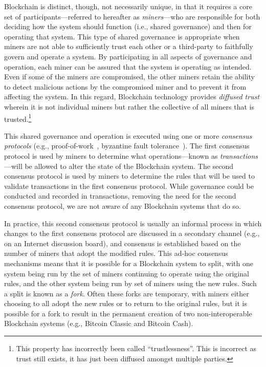 Blockchain is distinct, though, not necessarily unique, in that it requires a core set of participants---referred to hereafter as \emph{miners}---who are responsible for both deciding how the system should function (i.e., shared governance) and then for operating that system.
This type of shared governance is appropriate when miners are not able to sufficiently trust each other or a third-party to faithfully govern and operate a system.
By participating in all aspects of governance and operation, each miner can be assured that the system is operating as intended.
Even if some of the miners are compromised, the other miners retain the ability to detect malicious actions by the compromised miner and to prevent it from affecting the system.
In this regard, Blockchain technology provides \emph{diffused trust} wherein it is not individual miners but rather the collective of all miners that is trusted.\footnote{This property has incorrectly been called ``trustlessness''. This is incorrect as trust still exists, it has just been diffused amongst multiple parties.} 

This shared governance and operation is executed using one or more \emph{consensus protocols} (e.g., proof-of-work~\cite{DN93,back1997partial,NakamotoS8}, byzantine fault tolerance~\cite{castro1999practical}).
The first consensus protocol is used by miners to determine what operations---known as \emph{transactions}---will be allowed to alter the state of the Blockchain system.
The second consensus protocol is used by miners to determine the rules that will be used to validate transactions in the first consensus protocol.
While governance could be conducted and recorded in transactions, removing the need for the second consensus protocol, we are not aware of any Blockchain systems that do so.

In practice, this second consensus protocol is usually an informal process in which changes to the first consensus protocol are discussed in a secondary channel (e.g., on an Internet discussion board), and consensus is established based on the number of miners that adopt the modified rules.
This ad-hoc consensus mechanisms means that it is possible for a Blockchain system to split, with one system being run by the set of miners continuing to operate using the original rules, and the other system being run by set of miners using the new rules.
Such a split is known as a \emph{fork}.
Often these forks are temporary, with miners either choosing to all adopt the new rules or to return to the original rules, but it is possible for a fork to result in the permanent creation of two non-interoperable Blockchain systems (e.g., Bitcoin Classic and Bitcoin Cash).

